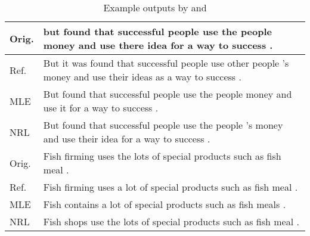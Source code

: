  
\begin{table*}[t]
\fontsize{9}{11}\selectfont
\centering
\begin{tabular}{l|l}
\hline
Orig. & but found that successful people use the people money and use there idea for a way to success .\\ \hline
Ref.  & But it was found that successful people use other people 's money and use their ideas as a way to success .\\ \hline \hline
MLE   & But found that successful people use the people money and use it for a way to success .\\ \hline
NRL   & But found that successful people use the people 's money and use their idea for a way to success .\\ \hline \hline
Orig. & Fish firming uses the lots of special products such as fish meal .\\ \hline
Ref.  & Fish firming uses a lot of special products such as fish meal .\\ \hline \hline
MLE   & Fish contains a lot of special products such as fish meals .\\ \hline
NRL   & Fish shops use the lots of special products such as fish meal .\\ \hline
\end{tabular}
\caption{Example outputs by \mle and \proposed}
\label{tab:examples}
\vspace{-2mm}
\end{table*}
  
